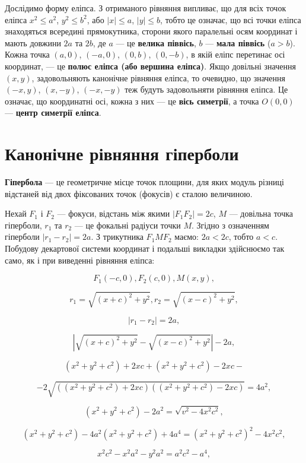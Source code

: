 Дослідимо форму еліпса. З отриманого рівняння
випливає, що для всіх точок еліпса
$x^2 \leqslant a^2$, $y^2 \leqslant b^2$, або $|x| \leqslant a$, $|y| \leqslant b$, тобто це
означає, що всі точки еліпса знаходяться всередині
прямокутника, сторони якого паралельні осям координат і мають довжини $2a$ та
$2b$, де $a$ --- це \textbf{велика піввісь}, $b$ --- \textbf{мала піввісь} ($a>b$). Кожна точка
$(a,0)$, $(-a,0)$, $(0,b)$, $(0,-b)$, в якій еліпс перетинає осі координат, --- це
\textbf{полюс еліпса (або вершина еліпса)}. Якщо довільні значення $(x,y)$, задовольняють
канонічне рівняння еліпса, то очевидно, що значення $(-x,y)$, $(x,-y)$, $(-x,-y)$ теж будуть
задовольняти рівняння еліпса. Це означає, що координатні осі, кожна з них --- це \textbf{вісь
симетрії}, а точка $O(0,0)$ --- \textbf{центр симетрії еліпса}. 

\section{Канонічне рівняння гіперболи}

\begin{definition}
	\textbf{Гіпербола} --- це геометричне місце точок площини, для яких
	модуль різниці відстаней від двох фіксованих точок (фокусів) є сталою величиною.
\end{definition}

Нехай $F_1$ і $F_2$ --- фокуси, відстань між якими $|F_1F_2| = 2c$, $M$ --- довільна точка
гіперболи, $r_1$ та $r_2$ --- це фокальні радіуси точки $M$.
Згідно з означенням гіперболи $|r_1 - r_2| = 2a$.
З трикутника $F_1MF_2$ маємо: $2a < 2c$, тобто $a < c$.
Побудову декартової системи координат і подальші
викладки здійснюємо так само, як і при виведенні рівняння еліпса:

$$F_1(-c,0), F_2(c,0), M(x,y),$$

$$r_1 = \sqrt{(x + c)^2 + y^2}, r_2 = \sqrt{(x - c)^2 + y^2},$$

$$|r_1 - r_2| = 2a,$$

$$|\sqrt{(x + c)^2 + y^2} - \sqrt{(x - c)^2 + y^2}| - 2a,$$

$$(x^2 + y^2 + c^2) + 2xc + (x^2 + y^2 + c^2) - 2xc -$$

$$-2\sqrt{((x^2+y^2+c^2)+2xc)((x^2+y^2+c^2)-2xc)} =4a^2,$$

$$(x^2+y^2+c^2) - 2a^2 = \sqrt{v^2 - 4x^2c^2},$$

$$(x^2+y^2+c^2) - 4a^2(x^2+y^2+c^2) + 4a^4 = (x^2+y^2+c^2)^2 - 4x^2c^2,$$

$$x^2c^2 - x^2a^2 - y^2a^2 = a^2c^2 - a^4,$$

